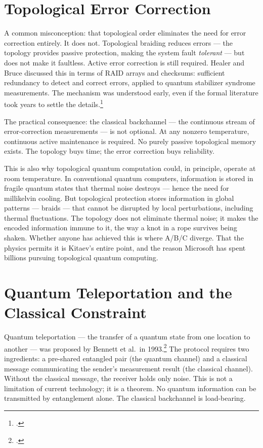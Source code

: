 \section*{Topological Error Correction}
\label{pos10:topological-error-correction}

A common misconception: that topological order eliminates the need for error correction entirely. It does not. Topological braiding reduces errors --- the topology provides passive protection, making the system fault \textit{tolerant} --- but does not make it faultless. Active error correction is still required. Healer and Bruce discussed this in terms of RAID arrays and checksums: sufficient redundancy to detect and correct errors, applied to quantum stabilizer syndrome measurements. The mechanism was understood early, even if the formal literature took years to settle the details.\footcite{nayak2008}

The practical consequence: the classical backchannel --- the continuous stream of error-correction measurements --- is not optional. At any nonzero temperature, continuous active maintenance is required. No purely passive topological memory exists. The topology buys time; the error correction buys reliability.

This is also why topological quantum computation could, in principle, operate at room temperature. In conventional quantum computers, information is stored in fragile quantum states that thermal noise destroys --- hence the need for millikelvin cooling. But topological protection stores information in global patterns --- braids --- that cannot be disrupted by local perturbations, including thermal fluctuations. The topology does not eliminate thermal noise; it makes the encoded information immune to it, the way a knot in a rope survives being shaken. Whether anyone has achieved this is where A/B/C diverge. That the physics permits it is Kitaev's entire point, and the reason Microsoft has spent billions pursuing topological quantum computing.

\section*{Quantum Teleportation and the Classical Constraint}
\label{pos10:quantum-teleportation-and-the-classical-constraint}

Quantum teleportation --- the transfer of a quantum state from one location to another --- was proposed by Bennett et al.\ in 1993.\footcite{bennett1993} The protocol requires two ingredients: a pre-shared entangled pair (the quantum channel) and a classical message communicating the sender's measurement result (the classical channel). Without the classical message, the receiver holds only noise. This is not a limitation of current technology; it is a theorem. No quantum information can be transmitted by entanglement alone. The classical backchannel is load-bearing.

